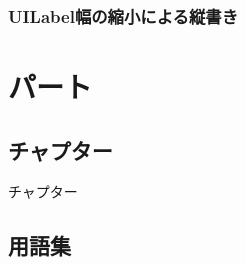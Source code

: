 \documentclass[10pt,twoside,openright,dvipdfmx]{jsbook}
\begin{document}
\section{{\sf UILabel}幅の縮小による縦書き}\label{chapter:ios/vertical/numberOfLines}


\part{パート}\label{part:draft}
\restoregeometry

\chapter{チャプター}\label{chapter:draft}
\thispagestyle{plain}
チャプター


\begin{appendices}
\restoregeometry
\chapter{用語集}
\thispagestyle{fancy}

\end{appendices}

\printbibheading[heading=bibintoc,title={参考文献}]
\thispagestyle{plain}
\printbibliography[heading=subbibintoc,type=online,title={Online}]

\printindex
\end{document}

